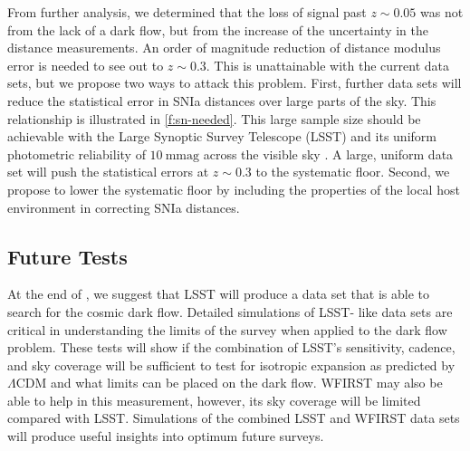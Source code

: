 \documentclass[apj, iop]{emulateapj}
\newcommand{\sn}{SNIa}
\newcommand{\todo}[1]{\textbf{\textcolor{red}{#1}}}
\newcommand{\lcdm}{$\Lambda$CDM}     %
\begin{document}
From further analysis, we determined that the loss of signal past $z \sim 0.05$
was not from the lack of a dark flow, but from the increase of the uncertainty
in the distance measurements. An order of magnitude reduction of distance
modulus error is needed to see out to $z \sim 0.3$. This is unattainable with
the current data sets, but we propose two ways to attack this problem. First,
further data sets will reduce the statistical error in \sn{} distances over
large parts of the sky. This relationship is illustrated in \cref{f:sn-needed}.
This large sample size should be achievable with the Large Synoptic Survey
Telescope (LSST) and its uniform photometric reliability of $10 ~\text{mmag}$
across the visible sky \citep{Ivezic08}. A large, uniform data set will push the
statistical errors at $z\sim 0.3$ to the systematic floor. Second, we propose to
lower the systematic floor by including the properties of the local host
environment in correcting \sn{} distances.

\subsection{Future Tests}\label{future-tests}

At the end of \cite{Mathews16}, we suggest that LSST will produce a data set
that is able to search for the cosmic dark flow. Detailed simulations of LSST-
like data sets are critical in understanding the limits of the survey when
applied to the dark flow problem. These tests will show if the combination of
LSST's sensitivity, cadence, and sky coverage will be sufficient to test for
isotropic expansion as predicted by \lcdm{} and what limits can be placed on the
dark flow. WFIRST may also be able to help in this measurement, however, its sky
coverage will be limited compared with LSST. Simulations of the combined LSST
and WFIRST data sets will produce useful insights into optimum future surveys.
\end{document}
